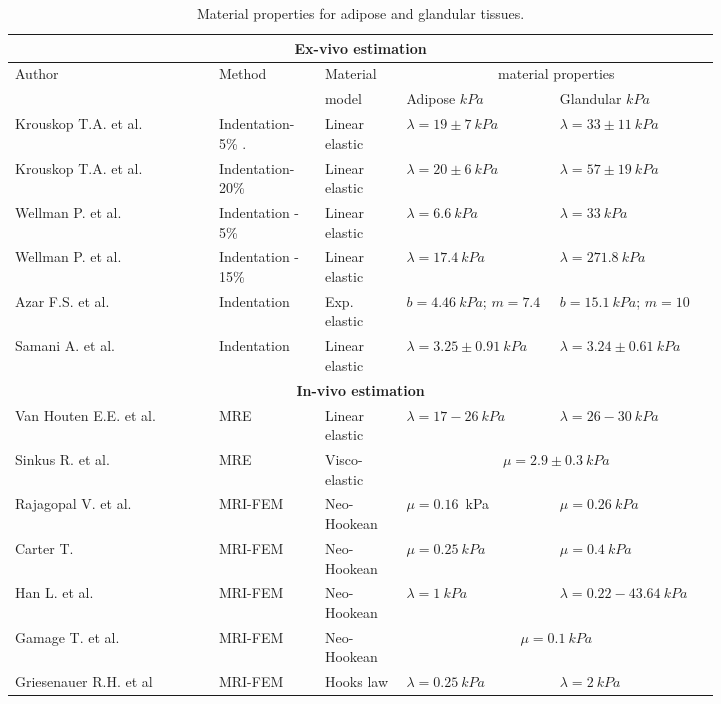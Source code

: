 \begin{table}[!h]
\centering
\begin{tabular}{|p{0.25\linewidth}|p{0.13\linewidth}|p{0.1\linewidth}|p{0.17\linewidth}|p{0.17\linewidth}|}
 \hline
\multicolumn{5}{|c|}{\textbf{Ex-vivo estimation}}\\ \hline

\multirow{2}{*}{ Author} & \multirow{2}{*}{ Method} &  Material & \multicolumn{2}{c|}{material properties}\\  \cline{4-5}

&& model &Adipose $kPa$ & Glandular $kPa$ \\  \hline

Krouskop T.A. et al. \citep{krouskop_elastic_1998} & Indentation-5\% . & Linear elastic & $\lambda=19 \pm 7\ kPa$ &$ \lambda =33 \pm 11\ kPa$ \\ \hline
Krouskop T.A. et al. \citep{krouskop_elastic_1998}   & Indentation- 20\%& Linear elastic & $\lambda=20 \pm 6\ kPa  $& $\lambda= 57 \pm 19\ kPa $ \\  \hline
 Wellman P. et al. \citep{wellman_breast_1999}  & Indentation - 5\% & Linear elastic & $\lambda=6.6\ kPa $ & $\lambda= 33 \ kPa$\\ \hline
 Wellman P. et al. \citep{wellman_breast_1999}  & Indentation - 15\% & Linear elastic &$ \lambda = 17.4\ kPa $& $\lambda= 271.8\ kPa $ \\ \hline
 Azar F.S. et al. \citep{azar_methods_2002} & Indentation & Exp. elastic & $b = 4.46\ kPa$; $m=7.4$ & $b = 15.1\ kPa$; $m=10$ \\ \hline
 Samani A. et al. \citep{samani_method_2004} & Indentation & Linear elastic & $\lambda= 3.25 \pm 0.91\ kPa $ & $\lambda= 3.24 \pm 0.61\ kPa $ \\ \hline \hline
 \multicolumn{5}{|c|}{\textbf{In-vivo estimation}}\\ \hline
Van Houten E.E. et al. \citep{van_initial_2003} & MRE & Linear elastic & $\lambda= 17-26\ kPa $ & $\lambda= 26-30\ kPa $ \\ \hline
 Sinkus R. et al. \citep{sinkus_viscoelastic_2005}&MRE& Visco-elastic & \multicolumn{2}{|c|}{$\mu = 2.9 \pm 0.3\ kPa$} \\ \hline
 Rajagopal V. et al. \citep{rajagopal_creating_2008}  & MRI-FEM& Neo-Hookean & $\mu = 0.16$\ kPa & $\mu = 0.26\ kPa$ \\ \hline
 Carter T. \citep{carter_determining_2009} & MRI-FEM& Neo-Hookean &$\mu = 0.25\ kPa$ & $\mu = 0.4\ kPa$ \\ \hline
 Han L. et al. \citep{han_development_2012} & MRI-FEM & Neo-Hookean & $\lambda= 1\ kPa$ & $\lambda = 0.22-43.64\ kPa $ \\ \hline 
 Gamage T. et al.\citep{gamage_modelling_2012} & MRI-FEM & Neo-Hookean & \multicolumn{2}{|c|}{$\mu = 0.1\ kPa $} \\ \hline
Griesenauer R.H. et al \citep{griesenauer_breast_2017} & MRI-FEM & Hooks law & $\lambda= 0.25\ kPa$ & $\lambda= 2\ kPa$\\ \hline
\end{tabular}
\caption{Material properties for adipose and glandular tissues.}
\label{table:materialproperties}
\end{table}

